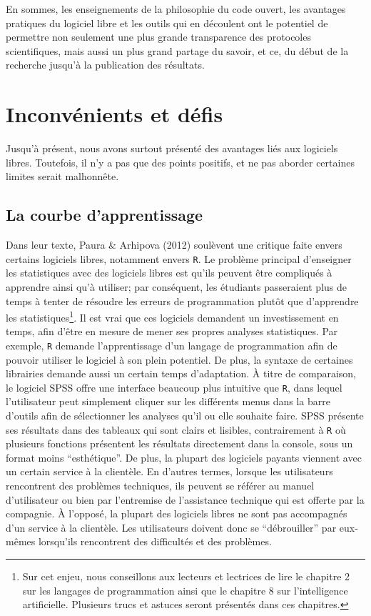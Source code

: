 \documentclass[
  letterpaper,
  DIV=11,
  numbers=noendperiod]{scrreprt}
\begin{document}
En sommes, les enseignements de la philosophie du code ouvert, les
avantages pratiques du logiciel libre et les outils qui en découlent ont
le potentiel de permettre non seulement une plus grande transparence des
protocoles scientifiques, mais aussi un plus grand partage du savoir, et
ce, du début de la recherche jusqu'à la publication des résultats.

\section{Inconvénients et défis}\label{inconvuxe9nients-et-duxe9fis}

Jusqu'à présent, nous avons surtout présenté des avantages liés aux
logiciels libres. Toutefois, il n'y a pas que des points positifs, et ne
pas aborder certaines limites serait malhonnête.

\subsection{La courbe d'apprentissage}\label{la-courbe-dapprentissage}

Dans leur texte, Paura \& Arhipova (2012) soulèvent une critique faite
envers certains logiciels libres, notamment envers \texttt{R}. Le
problème principal d'enseigner les statistiques avec des logiciels
libres est qu'ils peuvent être compliqués à apprendre ainsi qu'à
utiliser; par conséquent, les étudiants passeraient plus de temps à
tenter de résoudre les erreurs de programmation plutôt que d'apprendre
les statistiques\footnote{Sur cet enjeu, nous conseillons aux lecteurs
  et lectrices de lire le chapitre 2 sur les langages de programmation
  ainsi que le chapitre 8 sur l'intelligence artificielle. Plusieurs
  trucs et astuces seront présentés dans ces chapitres.}. Il est vrai
que ces logiciels demandent un investissement en temps, afin d'être en
mesure de mener ses propres analyses statistiques. Par exemple,
\texttt{R} demande l'apprentissage d'un langage de programmation afin de
pouvoir utiliser le logiciel à son plein potentiel. De plus, la syntaxe
de certaines librairies demande aussi un certain temps d'adaptation. À
titre de comparaison, le logiciel SPSS offre une interface beaucoup plus
intuitive que \texttt{R}, dans lequel l'utilisateur peut simplement
cliquer sur les différents menus dans la barre d'outils afin de
sélectionner les analyses qu'il ou elle souhaite faire. SPSS présente
ses résultats dans des tableaux qui sont clairs et lisibles,
contrairement à \texttt{R} où plusieurs fonctions présentent les
résultats directement dans la console, sous un format moins
``esthétique''. De plus, la plupart des logiciels payants viennent avec
un certain service à la clientèle. En d'autres termes, lorsque les
utilisateurs rencontrent des problèmes techniques, ils peuvent se
référer au manuel d'utilisateur ou bien par l'entremise de l'assistance
technique qui est offerte par la compagnie. À l'opposé, la plupart des
logiciels libres ne sont pas accompagnés d'un service à la clientèle.
Les utilisateurs doivent donc se ``débrouiller'' par eux-mêmes
lorsqu'ils rencontrent des difficultés et des problèmes.
\end{document}
